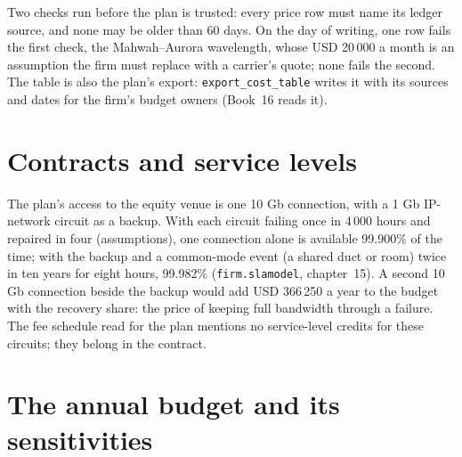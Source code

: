 Two checks run before the plan is trusted: every price row must name its ledger source, and none may be older than 60 days. On the day
of writing, one row fails the first check, the Mahwah--Aurora wavelength, whose USD 20\,000 a month is an assumption the firm must replace
with a carrier's quote; none fails the second. The table is also the plan's export: \texttt{export\_cost\_table} writes it with its
sources and dates for the firm's budget owners (Book~16 reads it).

\section{Contracts and service levels}

The plan's access to the equity venue is one 10 Gb connection, with a 1 Gb IP-network circuit as a backup. With each circuit failing
once in 4\,000 hours and repaired in four (assumptions), one connection alone is available 99.900\% of the time; with the backup and a
common-mode event (a shared duct or room) twice in ten years for eight hours, 99.982\% (\texttt{firm.slamodel}, chapter~15). A second
10 Gb connection beside the backup would add USD 366\,250 a year to the budget with the recovery share: the price of keeping full
bandwidth through a failure. The fee schedule read for the plan mentions no
service-level credits for these circuits; they belong in the contract.

\section{The annual budget and its sensitivities}

\begin{omfigure}

\label{fig:nw:build-a-connectivity-plan:budget}
\end{omfigure}

